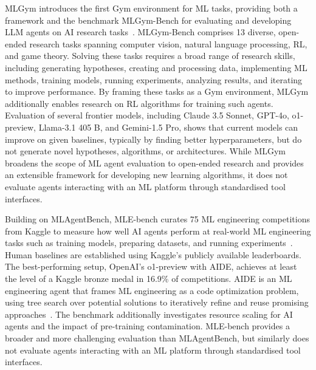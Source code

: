 \documentclass[
english,                 %
bibtex,                  %
includeExtraAbstracts, %
]{kththesis}
\numberwithin{listing}{chapter}
\begin{document}
\gls{ML}Gym introduces the first Gym environment for \gls{ML} tasks, providing both a framework and the benchmark \gls{ML}Gym-Bench for evaluating and developing \gls{LLM} agents on \gls{AI} research tasks~\cite{nathani_mlgym_2025}. \gls{ML}Gym-Bench comprises 13 diverse, open-ended research tasks spanning computer vision, natural language processing, \gls{RL}, and game theory. Solving these tasks requires a broad range of research skills, including generating hypotheses, creating and processing data, implementing \gls{ML} methods, training models, running experiments, analyzing results, and iterating to improve performance. By framing these tasks as a Gym environment, \gls{ML}Gym additionally enables research on \gls{RL} algorithms for training such agents. Evaluation of several frontier models, including Claude 3.5 Sonnet, \gls{GPT}-4o, o1-preview, Llama-3.1 405 \gls{B}, and Gemini-1.5 Pro, shows that current models can improve on given baselines, typically by finding better hyperparameters, but do not generate novel hypotheses, algorithms, or architectures. While \gls{ML}Gym broadens the scope of \gls{ML} agent evaluation to open-ended research and provides an extensible framework for developing new learning algorithms, it does not evaluate agents interacting with an \gls{ML} platform through standardised tool interfaces.

Building on \gls{ML}AgentBench, \gls{MLE}-bench curates 75 \gls{ML} engineering competitions from Kaggle to measure how well \gls{AI} agents perform at real-world \gls{ML} engineering tasks such as training models, preparing datasets, and running experiments~\cite{chan_mle-bench_2025}. Human baselines are established using Kaggle's publicly available leaderboards. The best-performing setup, Open\Gls{AI}'s o1-preview with \gls{AIDE}, achieves at least the level of a Kaggle bronze medal in 16.9\% of competitions. \Gls{AIDE} is an \gls{ML} engineering agent that frames ML engineering as a code optimization problem, using tree search over potential solutions to iteratively refine and reuse promising approaches~\cite{jiang_aide_2025}. The benchmark additionally investigates resource scaling for \gls{AI} agents and the impact of pre-training contamination. \Gls{MLE}-bench provides a broader and more challenging evaluation than \gls{ML}AgentBench, but similarly does not evaluate agents interacting with an \gls{ML} platform through standardised tool interfaces.
\end{document}
